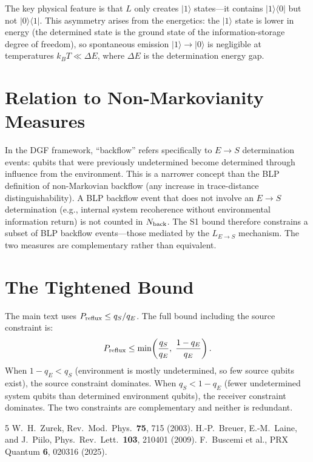 \documentclass[aps,prl,onecolumn]{revtex4-2}
\begin{document}
The key physical feature is that $L$ only creates $|1\rangle$ states---it contains $|1\rangle\langle 0|$ but not $|0\rangle\langle 1|$. This asymmetry arises from the energetics: the $|1\rangle$ state is lower in energy (the determined state is the ground state of the information-storage degree of freedom), so spontaneous emission $|1\rangle\to|0\rangle$ is negligible at temperatures $k_B T \ll \Delta E$, where $\Delta E$ is the determination energy gap.

\section{Relation to Non-Markovianity Measures}

In the DGF framework, ``backflow'' refers specifically to $E\to S$ determination events: qubits that were previously undetermined become determined through influence from the environment. This is a narrower concept than the BLP definition of non-Markovian backflow (any increase in trace-distance distinguishability). A BLP backflow event that does not involve an $E\to S$ determination (e.g., internal system recoherence without environmental information return) is not counted in $N_{\rm back}$. The S1 bound therefore constrains a subset of BLP backflow events---those mediated by the $L_{E\to S}$ mechanism. The two measures are complementary rather than equivalent.

\section{The Tightened Bound}

The main text uses $P_{\rm reflux} \leq q_S/q_E$. The full bound including the source constraint is:
\begin{equation}
P_{\rm reflux} \leq \min\!\left(\frac{q_S}{q_E},\; \frac{1-q_E}{q_E}\right).
\end{equation}
When $1-q_E < q_S$ (environment is mostly undetermined, so few source qubits exist), the source constraint dominates. When $q_S < 1-q_E$ (fewer undetermined system qubits than determined environment qubits), the receiver constraint dominates. The two constraints are complementary and neither is redundant.

\begin{thebibliography}{5}
 W.~H.~Zurek, Rev.\ Mod.\ Phys.\ \textbf{75}, 715 (2003).
 H.-P.~Breuer, E.-M.~Laine, and J.~Piilo, Phys.\ Rev.\ Lett.\ \textbf{103}, 210401 (2009).
 F.~Buscemi et al., PRX Quantum \textbf{6}, 020316 (2025).
\end{thebibliography}
\end{document}
